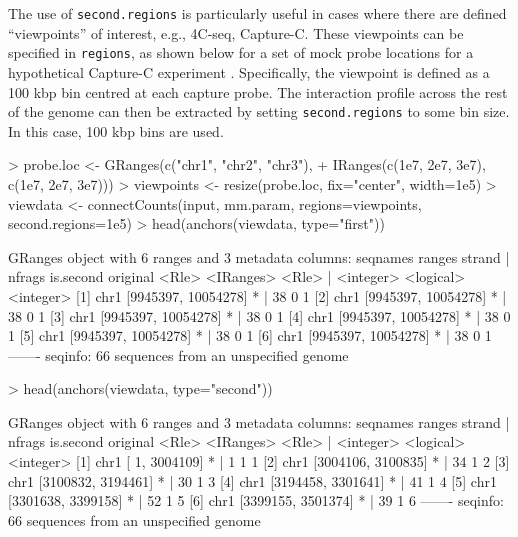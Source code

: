 \documentclass[12pt]{report}
\renewenvironment{Schunk}{\vspace{0pt}}{\vspace{0pt}}
\newcommand{\code}[1]{{\small\texttt{#1}}}
\begin{document}
The use of \code{second.regions} is particularly useful in cases where there are defined ``viewpoints'' of interest, e.g., 4C-seq, Capture-C.
These viewpoints can be specified in \code{regions}, as shown below for a set of mock probe locations for a hypothetical Capture-C experiment \citep{hughes2014analysis}.
Specifically, the viewpoint is defined as a 100 kbp bin centred at each capture probe.
The interaction profile across the rest of the genome can then be extracted by setting \code{second.regions} to some bin size.
In this case, 100 kbp bins are used.

\begin{Schunk}
\begin{Sinput}
> probe.loc <- GRanges(c("chr1", "chr2", "chr3"),
+     IRanges(c(1e7, 2e7, 3e7), c(1e7, 2e7, 3e7)))
> viewpoints <- resize(probe.loc, fix="center", width=1e5)
> viewdata <- connectCounts(input, mm.param, regions=viewpoints, second.regions=1e5)
> head(anchors(viewdata, type="first"))
\end{Sinput}
\begin{Soutput}
GRanges object with 6 ranges and 3 metadata columns:
      seqnames              ranges strand |    nfrags is.second  original
         <Rle>           <IRanges>  <Rle> | <integer> <logical> <integer>
  [1]     chr1 [9945397, 10054278]      * |        38         0         1
  [2]     chr1 [9945397, 10054278]      * |        38         0         1
  [3]     chr1 [9945397, 10054278]      * |        38         0         1
  [4]     chr1 [9945397, 10054278]      * |        38         0         1
  [5]     chr1 [9945397, 10054278]      * |        38         0         1
  [6]     chr1 [9945397, 10054278]      * |        38         0         1
  -------
  seqinfo: 66 sequences from an unspecified genome
\end{Soutput}
\begin{Sinput}
> head(anchors(viewdata, type="second"))
\end{Sinput}
\begin{Soutput}
GRanges object with 6 ranges and 3 metadata columns:
      seqnames             ranges strand |    nfrags is.second  original
         <Rle>          <IRanges>  <Rle> | <integer> <logical> <integer>
  [1]     chr1 [      1, 3004109]      * |         1         1         1
  [2]     chr1 [3004106, 3100835]      * |        34         1         2
  [3]     chr1 [3100832, 3194461]      * |        30         1         3
  [4]     chr1 [3194458, 3301641]      * |        41         1         4
  [5]     chr1 [3301638, 3399158]      * |        52         1         5
  [6]     chr1 [3399155, 3501374]      * |        39         1         6
  -------
  seqinfo: 66 sequences from an unspecified genome
\end{Soutput}
\end{Schunk}
\end{document}
